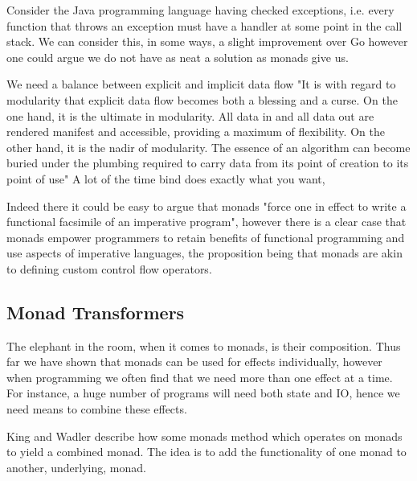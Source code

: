 Consider the Java programming language having checked exceptions,
i.e. every function that throws an exception must have a handler
at some point in the call stack.
We can consider this, in some ways, a slight improvement
over Go however one could argue we do not have as neat a solution
as monads give us.

We need a balance between explicit and implicit data flow
\cite{wadler1995monads}
"It is with regard to modularity that explicit data flow becomes both a blessing and a curse.
On the one hand, it is the ultimate in modularity.
All data in and all data out are rendered manifest and accessible, providing a maximum of flexibility. On the other hand, it is the nadir of modularity. The essence of an algorithm can become buried under the plumbing required to carry data from its point of creation to its point of use"
\cite{wadler1995monads}
A lot of the time bind does exactly what you want,

Indeed there it could be easy to argue that monads "force
one in effect to write a functional facsimile of an imperative program",
however there is a clear case that monads empower programmers
to retain benefits of functional programming and use aspects of imperative languages\cite{PeytonJones:1993},
the proposition being that monads are akin to defining custom control flow operators.

\subsection{Monad Transformers}
The elephant in the room, when it comes to monads, is their composition.
Thus far we have shown that monads can be used for effects individually,
however when programming we often find that we need more than one effect
at a time.
For instance, a huge number of programs will need both state and IO,
hence we need means to combine these effects.

King and Wadler \cite{king1993combining}
describe how some monads method which operates on monads to yield a combined monad.
The idea is to add the functionality of one monad to another, underlying, monad.

